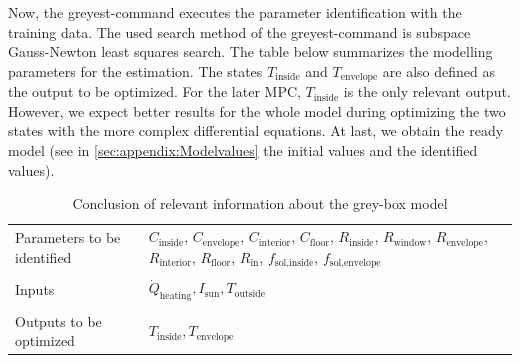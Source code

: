     Now, the greyest-command executes the parameter identification with the training data. The used search method of the greyest-command is subspace Gauss-Newton least squares search. The table below summarizes the modelling parameters for the estimation. The states $T_\text{inside}$ and $T_\text{envelope}$ are also defined as the output to be optimized. For the later MPC, $T_\text{inside}$ is the only relevant output. However, we expect better results for the whole model during optimizing the two states with the more complex differential equations. 
    At last, we obtain the ready model (see in \autoref{sec:appendix:Modelvalues} the initial values and the identified values).
     
    \begin{table}[]
        \centering
        \begin{tabular}{p{5cm}|p{8cm}}
        Parameters to be identified &  $C_\text{inside}$,  $C_\text{envelope}$,  $C_\text{interior}$, $C_\text{floor}$, $R_\text{inside}$, $R_\text{window}$, $R_\text{envelope}$, $R_\text{interior}$, $R_\text{floor}$, $R_\text{in}$, $f_\text{sol,inside}$, $f_\text{sol,envelope}$ \\
        &\\
        Inputs & $\dot{Q}_\text{heating}, I_\text{sun}, T_\text{outside}$\\
        &\\
        Outputs to be optimized & $T_\text{inside}, T_\text{envelope}$
        \end{tabular}
        \caption{Conclusion of relevant information about the grey-box model}
        \label{tab:Greybox}
    \end{table}
    
